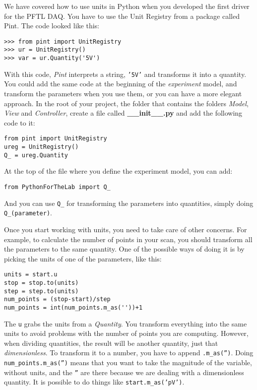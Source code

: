 {We have covered how to use units in Python when you developed the first
driver for the {PFTL} {DAQ}. You have to use the Unit Registry from a
package called Pint. The code looked like this:

\begin{verbatim}
>>> from pint import UnitRegistry
>>> ur = UnitRegistry()
>>> var = ur.Quantity('5V')
\end{verbatim}

With this code, \emph{Pint} interprets a string,
\texttt{'5V'} and transforms it into a
quantity. You could add the same code at the beginning of the
\emph{experiment} model, and transform the parameters when you use them,
or you can have a more elegant approach. In the root of your project,
the folder that contains the folders \emph{Model}, \emph{View} and
\emph{Controller}, create a file called \textbf{\_\_init\_\_.py} and add
the following code to it:

\begin{verbatim}
from pint import UnitRegistry
ureg = UnitRegistry()
Q_ = ureg.Quantity
\end{verbatim}

At the top of the file where you define the experiment model, you
can add:

\begin{verbatim}
from PythonForTheLab import Q_
\end{verbatim}

And you can use \texttt{Q_} for transforming the parameters into
quantities, simply doing \texttt{Q_(parameter)}.


Once you start working with units, you need to take care of other
concerns. For example, to calculate the number of points in your scan,
you should transform all the parameters to the same quantity. One of the
possible ways of doing it is by picking the units of one of the
parameters, like this:

\begin{verbatim}
units = start.u
stop = stop.to(units)
step = step.to(units)
num_points = (stop-start)/step
num_points = int(num_points.m_as(''))+1
\end{verbatim}

The \texttt{u} grabs the units from a \emph{Quantity}. You transform
everything into the same units to avoid problems with the number of
points you are computing. However, when dividing quantities, the result
will be another quantity, just that \emph{dimensionless}. To transform
it to a number, you have to append
\texttt{.m_as('')}. Doing
\texttt{num_points.m_as('')} means
that you want to take the magnitude of the variable, without units, and
the \texttt{''} are there because we
are dealing with a dimensionless quantity. It is possible to do things
like \texttt{start.m_as('pV')}.

}
